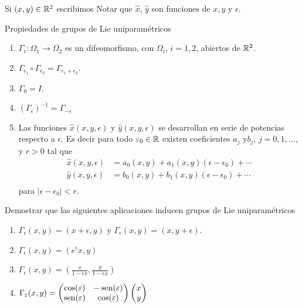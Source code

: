  Si $(x,y)\in\mathbb{R}^2$ escribimos
 Notar que $\hat{x}$, $\hat{y}$ son funciones de $x,y$ y $\epsilon$.



\begin{boite}[boxcolor=orange, background=blue!5, titlebackground=blue!20,
  titleboxcolor = black]{Propiedades de grupos de Lie uniparamétricos}
\begin{enumerate}
\item$\Gamma_{\epsilon}:\Omega_1\to\Omega_2$ es un difeomorfismo, con $\Omega_i$, $i=1,2$, abiertos de $\mathbb{R}^2$.
 \item $\Gamma_{\epsilon_1}\circ \Gamma_{\epsilon_2}=\Gamma_{\epsilon_1+\epsilon_2}$.

\item $\Gamma_0=I$.

\item $\left(\Gamma_{\epsilon}\right)^{-1}=\Gamma_{-\epsilon}$

\item Las funciones  $\hat{x}(x,y,\epsilon)$ y $\hat{y}(x,y,\epsilon)$  se desarrollan en serie de potencias respecto a $\epsilon$. Es decir para todo $\varepsilon_0\in\mathbb{R}$ existen coeficientes $a_j$ y$b_j$, $j=0,1,\ldots$, y $r>0$ tal que
\[
\begin{array}{cc}
\hat{x}(x,y,\epsilon)&=a_0(x,y)+a_1(x,y)(\epsilon- \epsilon_0)+\cdots\\
\hat{y}(x,y,\epsilon)&=b_0(x,y)+b_1(x,y)(\epsilon- \epsilon_0)+\cdots\\
\end{array}
\]
para $|\epsilon-\epsilon_0|<r$.
\end{enumerate}


\end{boite}



\begin{ejemplo} Demostrar que las siguientes aplicaciones inducen grupos de Lie uniparamétricos
\begin{enumerate}
\item $\Gamma_{\epsilon}(x,y)=(x+\epsilon,y)$ y $\Gamma_{\epsilon}(x,y)=(x,y+\epsilon)$.
\item $\Gamma_{\epsilon}(x,y)=(e^{\epsilon}x,y)$
\item$\Gamma_{\epsilon}(x,y)=\left(\frac{x}{1-\epsilon x},\frac{y}{1-\epsilon x} \right)$
\item$\Gamma_{\varepsilon}(x,y)=\begin{pmatrix} \cos(\varepsilon) & -\operatorname{sen}(\varepsilon)
\\ \operatorname{sen}(\varepsilon) & \cos(\varepsilon)
\end{pmatrix} \begin{pmatrix} x\\ y
\end{pmatrix}
$
\end{enumerate}
\end{ejemplo}


